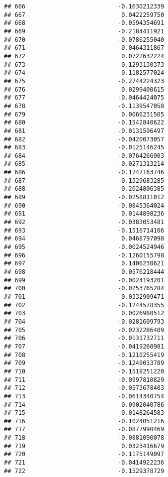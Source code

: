 \documentclass[
]{article}
\begin{document}
\begin{verbatim}
## 666                          -0.1630212339
## 667                           0.0422259750
## 668                          -0.0594354691
## 669                          -0.2184411921
## 670                          -0.0786255040
## 671                          -0.0464311867
## 672                           0.0722632224
## 673                          -0.1293130373
## 674                          -0.1182577024
## 675                          -0.2744224323
## 676                           0.0299400615
## 677                          -0.0464424075
## 678                          -0.1139547058
## 679                           0.0066231505
## 680                          -0.1542840622
## 681                          -0.0131596497
## 682                          -0.0420073057
## 683                          -0.0125146245
## 684                          -0.0764266903
## 685                          -0.0271313214
## 686                          -0.1747163746
## 687                          -0.1529683285
## 688                          -0.2024806385
## 689                          -0.0258811012
## 690                          -0.0845364024
## 691                           0.0144898236
## 692                          -0.0383053481
## 693                          -0.1516714106
## 694                           0.0468797098
## 695                          -0.0024524946
## 696                          -0.1260155798
## 697                           0.1406230621
## 698                           0.0576218444
## 699                          -0.0024193201
## 700                          -0.0253765284
## 701                           0.0332909471
## 702                          -0.1244578355
## 703                           0.0026980512
## 704                          -0.0281609793
## 705                          -0.0232286409
## 706                          -0.0131732711
## 707                          -0.0419260981
## 708                          -0.1210255419
## 709                          -0.1249033789
## 710                          -0.1518251220
## 711                          -0.0997810829
## 712                          -0.0573678403
## 713                          -0.0614340754
## 714                          -0.0902040786
## 715                           0.0148264583
## 716                          -0.1024051216
## 717                          -0.0877990469
## 718                          -0.0881090078
## 719                           0.0323416679
## 720                          -0.1175149097
## 721                          -0.0414922236
## 722                          -0.1529378729

\end{verbatim}
\end{document}
